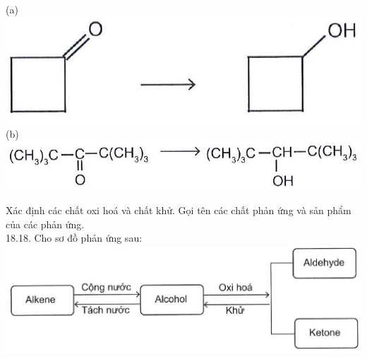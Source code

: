 \documentclass[10pt]{article}
\begin{document}
(a)\\
\includegraphics[max width=\textwidth, center]{2025_10_23_ae7aef68fb3b41082d29g-45(3)}\\
(b)\\
\includegraphics[max width=\textwidth, center]{2025_10_23_ae7aef68fb3b41082d29g-45}

Xác định các chất oxi hoá và chất khử. Gọi tên các chất phản ứng và sản phẩm của các phản ứng.\\
18.18. Cho sơ đồ phản ứng sau:\\
\includegraphics[max width=\textwidth, center]{2025_10_23_ae7aef68fb3b41082d29g-45(4)}
\end{document}
